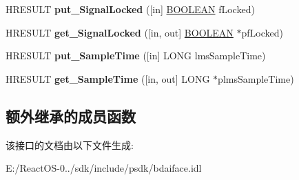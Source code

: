 \begin{DoxyCompactItemize}
H\+R\+E\+S\+U\+LT {\bfseries put\+\_\+\+Signal\+Locked} (\mbox{[}in\mbox{]} \hyperlink{_processor_bind_8h_a112e3146cb38b6ee95e64d85842e380a}{B\+O\+O\+L\+E\+AN} f\+Locked)
\item 
\mbox{\label{interface_i_b_d_a___signal_statistics_aaf6cc1d6d8fa6fdeadba5a098d705ab1}} 
H\+R\+E\+S\+U\+LT {\bfseries get\+\_\+\+Signal\+Locked} (\mbox{[}in, out\mbox{]} \hyperlink{_processor_bind_8h_a112e3146cb38b6ee95e64d85842e380a}{B\+O\+O\+L\+E\+AN} $\ast$pf\+Locked)
\item 
\mbox{\label{interface_i_b_d_a___signal_statistics_a9102b25341b259c4b7d35831bb83bb5d}} 
H\+R\+E\+S\+U\+LT {\bfseries put\+\_\+\+Sample\+Time} (\mbox{[}in\mbox{]} L\+O\+NG lms\+Sample\+Time)
\item 
\mbox{\label{interface_i_b_d_a___signal_statistics_a6ad7c7494f6d80a69a68761aa3883992}} 
H\+R\+E\+S\+U\+LT {\bfseries get\+\_\+\+Sample\+Time} (\mbox{[}in, out\mbox{]} L\+O\+NG $\ast$plms\+Sample\+Time)
\end{DoxyCompactItemize}
\subsection*{额外继承的成员函数}


该接口的文档由以下文件生成\+:\begin{DoxyCompactItemize}
\item 
E\+:/\+React\+O\+S-\/0../sdk/include/psdk/bdaiface.\+idl\end{DoxyCompactItemize}
